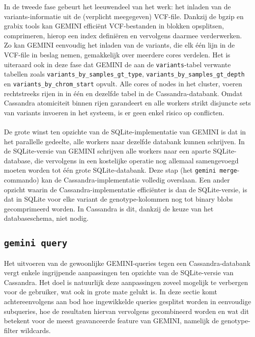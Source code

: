 In de tweede fase gebeurt het leeuwendeel van het werk: het inladen van de variants-informatie uit de (verplicht meegegeven) VCF-file. Dankzij de bgzip \cite{bgzip} en grabix \cite{grabix} tools kan GEMINI effici\"ent VCF-bestanden in blokken opsplitsen, comprimeren, hierop een index defini\"eren en vervolgens daarmee verderwerken. Zo kan GEMINI eenvoudig het inladen van de variants, die elk \'e\'en lijn in de VCF-file in beslag nemen, gemakkelijk over meerdere cores verdelen. Het is uiteraard ook in deze fase dat GEMINI de aan de \texttt{variants}-tabel verwante tabellen zoals \texttt{variants\_by\_samples\_gt\_type}, \texttt{variants\_by\_samples\_gt\_depth} en \texttt{variants\_by\_chrom\_start} opvult. Alle cores of nodes in het cluster, voeren rechtstreeks rijen in in \'e\'en en dezelfde tabel in de Cassandra-databank. Omdat Cassandra atomiciteit binnen rijen garandeert en alle workers strikt disjuncte sets van variants invoeren in het systeem, is er geen enkel risico op conflicten.\\\\
De grote winst ten opzichte van de SQLite-implementatie van GEMINI is dat in het parallelle gedeelte, alle workers naar dezelfde databank kunnen schrijven. In de SQLite-versie van GEMINI schrijven alle workers naar een aparte SQLite-database, die vervolgens in een kostelijke operatie nog allemaal samengevoegd moeten worden tot \'e\'en grote SQLite-databank. Deze stap (het \texttt{gemini merge}-commando) kan de Cassandra-implementatie volledig overslaan. Een ander opzicht waarin de Cassandra-implementatie effici\"enter is dan de SQLite-versie, is dat in SQLite voor elke variant de genotype-kolommen nog tot binary blobs gecomprimeerd worden. In Cassandra is dit, dankzij de keuze van het databaseschema, niet nodig.
 
\subsection{\texttt{gemini query}}

Het uitvoeren van de gewoonlijke GEMINI-queries tegen een Cassandra-databank vergt enkele ingrijpende aanpassingen ten opzichte van de SQLite-versie van Cassandra. Het doel is natuurlijk deze aanpassingen zoveel mogelijk te verbergen voor de gebruiker, wat ook in grote mate gelukt is. In deze sectie komt achtereenvolgens aan bod hoe ingewikkelde queries gesplitst worden in eenvoudige subqueries, hoe de resultaten hiervan vervolgens gecombineerd worden en wat dit betekent voor de meest geavanceerde feature van GEMINI, namelijk de genotype-filter wildcards.

